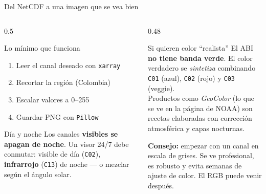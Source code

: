 \documentclass[10pt,aspectratio=169]{beamer}
\begin{document}
\begin{frame}{Del NetCDF a una imagen que se vea bien}
  \begin{columns}[T]
    \begin{column}{0.5\textwidth}
      \begin{block}{Lo mínimo que funciona}
        \small
        \begin{enumerate}\small
          \item Leer el canal deseado con \texttt{xarray}
          \item Recortar la región (Colombia)
          \item Escalar valores a 0--255
          \item Guardar PNG con \texttt{Pillow}
        \end{enumerate}
      \end{block}
      \begin{alertblock}{Día y noche}
        \small
        Los canales \textbf{visibles se apagan de noche}. Un visor 24/7 debe
        conmutar: visible de día (\texttt{C02}), \textbf{infrarrojo}
        (\texttt{C13}) de noche --- o mezclar según el ángulo solar.
      \end{alertblock}
    \end{column}
    \begin{column}{0.48\textwidth}
      \begin{block}{Si quieren color ``realista''}
        \small
        El ABI \textbf{no tiene banda verde}. El color verdadero se
        \emph{sintetiza} combinando \texttt{C01} (azul), \texttt{C02} (rojo) y
        \texttt{C03} (veggie).\\[0.3em]
        Productos como \emph{GeoColor} (lo que se ve en la página de NOAA) son
        recetas elaboradas con corrección atmosférica y capas nocturnas.
      \end{block}
      \footnotesize
      \textbf{Consejo:} empezar con un canal en escala de grises. Se ve
      profesional, es robusto y evita semanas de ajuste de color. El RGB puede
      venir después.
    \end{column}
  \end{columns}
\end{frame}
\end{document}
